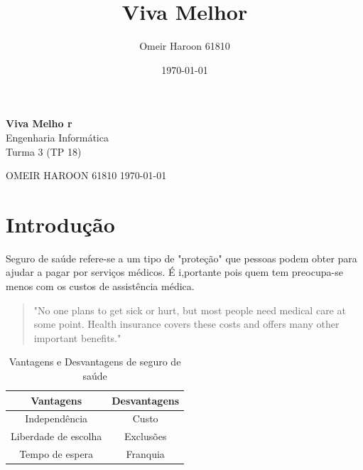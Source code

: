 \documentclass[10pt,a4paper]{article}
\title{Viva Melhor}
\author{Omeir Haroon 61810}
\date{\today}
\begin{document}
\begin{titlepage}
	\begin{center}
	{\Huge\bfseries Viva Melho r}\\
	\vspace{1cm}
	{\Large Engenharia Informática}\\
	\vspace{1cm}
	{\Large Turma 3 (TP 18)}\\
	\end{center}
	\begin{flushright}
	{\Large OMEIR HAROON \Large 61810 \hfill  \large\today}
	\end{flushright}
	\begin{figure}[h]
	\begin{center}
	\end{center}
	\end{figure}
\end{titlepage}



\section{Introdução}
	Seguro de saúde refere-se a um tipo de "proteção"
que pessoas podem obter para ajudar a pagar por serviços médicos. É i,portante pois quem tem preocupa-se menos com os custos de assistência médica.
\begin{quote}
    "No one plans to get sick or hurt, but most people need medical care at some point. Health insurance covers these costs and offers many other important benefits." \cite{healthcare}
\end{quote}

\begin{table}[h]
	\centering
	\caption{Vantagens e Desvantagens de seguro de saúde}
	\begin{tabular}{|c|c|} 
	\hline
	{\bfseries Vantagens} & {\bfseries Desvantagens}\\
	\hline
	Independência &  Custo\\
	\hline	
	Liberdade de escolha & Exclusões\\
	\hline	
	Tempo de espera  & Franquia\\
	\hline
	\end{tabular}
\end{table}
\newpage
\end{document}
